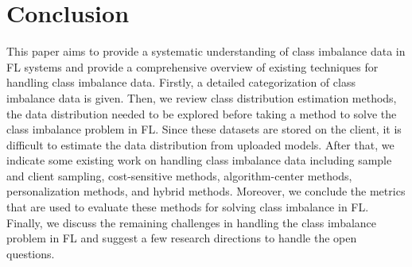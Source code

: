 \documentclass[10pt,journal,compsoc]{IEEEtran}
\begin{document}
	\section{Conclusion}
	This paper aims to provide a systematic understanding of class imbalance data in FL systems and provide a comprehensive overview of existing techniques for handling class imbalance data. Firstly, a detailed categorization of class imbalance data is given. Then, we review class distribution estimation methods, the data distribution needed to be explored before taking a method to solve the class imbalance problem in FL. Since these datasets are stored on the client, it is difficult to estimate the data distribution from uploaded models. After that, we indicate some existing work on handling class imbalance data including sample and client sampling, cost-sensitive methods, algorithm-center methods, personalization methods, and hybrid methods. Moreover, we conclude the metrics that are used to evaluate these methods for solving class imbalance in FL. Finally, we discuss the remaining challenges in handling the class imbalance problem in FL and suggest a few research directions to handle the open questions.
	
	
	
	
	
	
\end{document}
